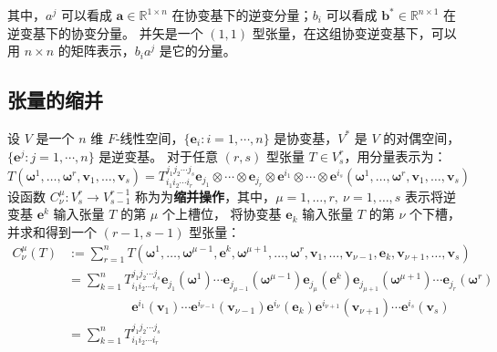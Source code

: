 \begin{note}
    其中，$a^j$ 可以看成 $\mathbf{a}\in \mathbb{R}^{1\times n}$ 在协变基下的逆变分量；$b_i$ 可以看成 $\mathbf{b}^*\in \mathbb{R}^{n\times 1}$ 在逆变基下的协变分量。
    并矢是一个 $(1,1)$ 型张量，在这组协变逆变基下，可以用 $n\times n$ 的矩阵表示，$b_ia^j$  是它的分量。
\end{note}

\vspace{1em}

\subsection{张量的缩并}

\begin{definition}[缩并 Contraction]
    设 $V$ 是一个 $n$ 维 $F$-线性空间，$\{\mathbf{e}_i:i=1,\cdots,n\}$ 是协变基，$V^*$ 是 $V$ 的对偶空间，$\{\mathbf{e}^j:j=1,\cdots,n\}$ 是逆变基。
    对于任意 $(r,s)$ 型张量 $T \in V^r_s$，用分量表示为：
    \[
        T(\bm{\omega}^1,\ldots,\bm{\omega}^r,\mathbf{v}_1,\ldots,\mathbf{v}_s) = 
        T_{i_1 i_2 \cdots i_r}^{j_1 j_2 \cdots j_s} 
        \mathbf{e}_{j_1} \otimes \cdots \otimes \mathbf{e}_{j_r} \otimes \mathbf{e}^{i_1} \otimes \cdots \otimes \mathbf{e}^{i_s}
        (\bm{\omega}^1,\ldots,\bm{\omega}^r,\mathbf{v}_1,\ldots,\mathbf{v}_s)
    \]
    设函数 $C^{\mu}_{\nu}: V^r_s \to V^{r-1}_{s-1}$ 称为为\textbf{缩并操作}，其中，$\mu=1,\ldots,r,\ \nu = 1,\ldots,s$ 表示将逆变基 $\mathbf{e}^k$ 输入张量 $T$ 的第 $\mu$ 个上槽位，
    将协变基 $\mathbf{e}_k$ 输入张量 $T$ 的第 $\nu$ 个下槽，并求和得到一个 $(r-1,s-1)$ 型张量：
    \begin{align*}
        C^{\mu}_{\nu}(T) &:= \sum_{r=1}^n T(\bm{\omega}^1,\ldots,\bm{\omega}^{\mu-1},\mathbf{e}^k,\bm{\omega}^{\mu+1},\ldots,\bm{\omega}^r,\mathbf{v}_1,\ldots,\mathbf{v}_{\nu-1},\mathbf{e}_k,\mathbf{v}_{\nu+1},\ldots,\mathbf{v}_s) \\
        &= \sum_{k=1}^n T_{i_1 i_2 \cdots i_r}^{j_1 j_2 \cdots j_s} 
        \mathbf{e}_{j_1}(\bm{\omega}^1) \cdots \mathbf{e}_{j_{\mu-1}}(\bm{\omega}^{\mu-1}) \mathbf{e}_{j_{\mu}}(\mathbf{e}^k) \mathbf{e}_{j_{\mu+1}}(\bm{\omega}^{\mu+1}) \cdots \mathbf{e}_{j_r}(\bm{\omega}^r) \\
        &\quad \quad \quad \quad \quad \mathbf{e}^{i_1}(\mathbf{v}_1) \cdots \mathbf{e}^{i_{\nu-1}}(\mathbf{v}_{\nu-1}) \mathbf{e}^{i_{\nu}}(\mathbf{e}_k) \mathbf{e}^{i_{\nu+1}}(\mathbf{v}_{\nu+1}) \cdots \mathbf{e}^{i_s}(\mathbf{v}_s) \\
        &= \sum_{k=1}^n T_{i_1 i_2 \cdots i_r}^{j_1 j_2 \cdots j_s}   

\end{align*}
\end{definition}
